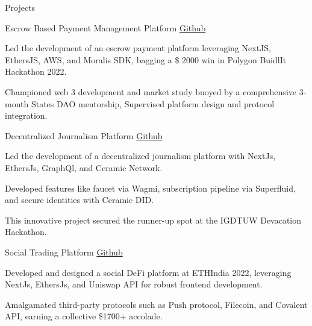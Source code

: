 \documentclass[10pt]{resume}
\begin{document}
    \begin{rSection}{Projects}
    
            \begin{rSubsection}{Escrow Based Payment Management Platform}                   {\href{https://github.com/RevereLabs}{Github}}
                \item Led the development of an escrow payment platform leveraging NextJS, EthersJS, AWS, and Moralis SDK, bagging a \$ 2000 win in Polygon BuidlIt Hackathon 2022. 
                \item Championed web 3 development and market study buoyed by a comprehensive 3-month States DAO mentorship, Supervised platform design and protocol integration.
    	\end{rSubsection}

         
         \begin{rSubsection}{Decentralized Journalism Platform}
            {\href{https://github.com/0xFethr}{Github}}
                \item Led the development of a decentralized journalism platform with NextJs, EthersJs, GraphQl, and Ceramic Network. 
                \item Developed features like faucet via Wagmi, subscription pipeline via Superfluid, and secure identities with Ceramic DID. 
                \item This innovative project secured the runner-up spot at the IGDTUW Devacation Hackathon.
        \end{rSubsection}
    
    
            \begin{rSubsection}{Social Trading Platform}
            {\href{https://github.com/AlkyneFi}{Github}}
                \item Developed and designed a social DeFi platform at ETHIndia 2022, leveraging NextJs, EthersJs, and Uniswap API for robust frontend development. 
                \item Amalgamated third-party protocols such as Push protocol, Filecoin, and Covalent API, earning a collective \$1700+ accolade.
    	\end{rSubsection}
    
    

\end{rSection}
\end{document}
